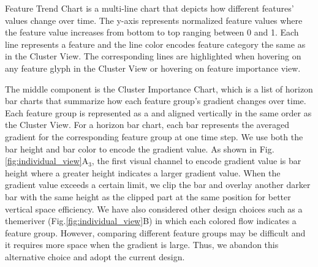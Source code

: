 Feature Trend Chart is a multi-line chart that depicts how different features' values change over time. 
The y-axis represents normalized feature values where the feature value increases from bottom to top ranging between 0 and 1.
Each line represents a feature and the line color encodes feature category the same as in the Cluster View.
The corresponding lines are highlighted when hovering on any feature glyph in the Cluster View or hovering on feature importance view. 

The middle component is the Cluster Importance Chart, which is a list of horizon bar charts that summarize how each feature group's gradient changes over time.
Each feature group is represented as a  and aligned vertically in the same order as the Cluster View.
For a horizon bar chart, each bar represents the averaged gradient for the corresponding feature group at one time step. 
We use both the bar height and bar color to encode the gradient value.
As shown in  Fig.\ref{fig:individual_view}A$_3$, the first visual channel to encode gradient value is bar height where a greater height indicates a larger gradient value.
When the gradient value exceeds a certain limit, we clip the bar and overlay another darker bar with the same height as the clipped part at the same position for better vertical space efficiency.
We have also considered other design choices such as a themeriver (Fig.\ref{fig:individual_view}B) in which each colored flow indicates a feature group. 
However, comparing different feature groups may be difficult and it requires more space when the gradient is large.
Thus, we abandon this alternative choice and adopt the current design.

